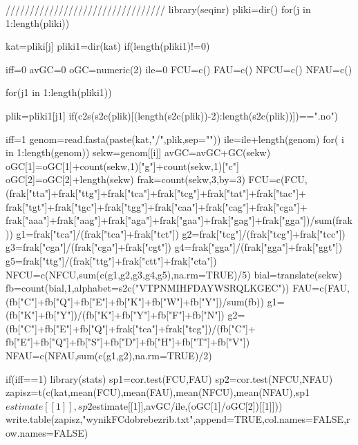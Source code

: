 /////////////////////////////////
library(seqinr)
pliki=dir()
for(j in 1:length(pliki))
{
kat=pliki[j]
pliki1=dir(kat)
if(length(pliki1)!=0)
{

iff=0
avGC=0
oGC=numeric(2)
ile=0
FCU=c()
FAU=c()
NFCU=c()
NFAU=c()

for(j1 in 1:length(pliki1))
{
plik=pliki1[j1]
if(c2s(s2c(plik)[(length(s2c(plik))-2):length(s2c(plik))])==".no")
{

iff=1
genom=read.fasta(paste(kat,"/",plik,sep=""))
ile=ile+length(genom)
for( i in 1:length(genom))
{
sekw=genom[[i]]
avGC=avGC+GC(sekw)
oGC[1]=oGC[1]+count(sekw,1)["g"]+count(sekw,1)["c"]
oGC[2]=oGC[2]+length(sekw)
frak=count(sekw,3,by=3)
FCU=c(FCU,(frak["tta"]+frak["ttg"]+frak["tca"]+frak["tcg"]+frak["tat"]+frak["tac"]+
frak["tgt"]+frak["tgc"]+frak["tgg"]+frak["caa"]+frak["cag"]+frak["cga"]+
frak["aaa"]+frak["aag"]+frak["aga"]+frak["gaa"]+frak["gag"]+frak["gga"])/sum(frak))
g1=frak["tca"]/(frak["tca"]+frak["tct"])
g2=frak["tcg"]/(frak["tcg"]+frak["tcc"])
g3=frak["cga"]/(frak["cga"]+frak["cgt"])
g4=frak["gga"]/(frak["gga"]+frak["ggt"])
g5=frak["ttg"]/(frak["ttg"]+frak["ctt"]+frak["cta"])
NFCU=c(NFCU,sum(c(g1,g2,g3,g4,g5),na.rm=TRUE)/5)
bial=translate(sekw)
fb=count(bial,1,alphabet=s2c("VTPNMIHFDAYWSRQLKGEC"))
FAU=c(FAU,(fb["C"]+fb["Q"]+fb["E"]+fb["K"]+fb["W"]+fb["Y"])/sum(fb))
g1=(fb["K"]+fb["Y"])/(fb["K"]+fb["Y"]+fb["F"]+fb["N"])
g2=(fb["C"]+fb["E"]+fb["Q"]+frak["tca"]+frak["tcg"])/(fb["C"]+
 fb["E"]+fb["Q"]+fb["S"]+fb["D"]+fb["H"]+fb["T"]+fb["V"])
NFAU=c(NFAU,sum(c(g1,g2),na.rm=TRUE)/2)
}

}
}
if(iff==1)
{
library(stats)
sp1=cor.test(FCU,FAU)
sp2=cor.test(NFCU,NFAU)
zapisz=t(c(kat,mean(FCU),mean(FAU),mean(NFCU),mean(NFAU),sp1$estimate[[1]],sp2$estimate[[1]],avGC/ile,(oGC[1]/oGC[2])[[1]]))
write.table(zapisz,"wynikFCdobrebezrib.txt",append=TRUE,col.names=FALSE,row.names=FALSE)
}
}
}
